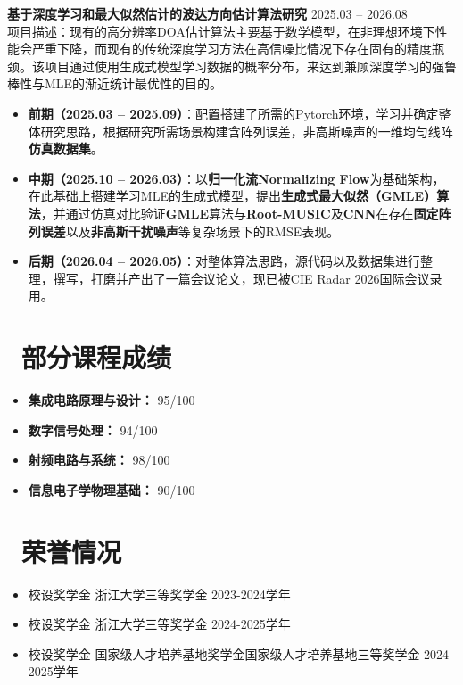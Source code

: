 \documentclass[11pt]{article}
\newlength{\interProjectSpacing}
\newcommand{\projectsep}{\vspace{\interProjectSpacing}}
\newlength{\intraProjectTitleSep}
\newcommand{\titlebreak}{\\[\intraProjectTitleSep]}
\newlength{\intraProjectListTopSep}
\begin{document}
\projectsep

\textbf{基于深度学习和最大似然估计的波达方向估计算法研究} \hfill 2025.03 -- 2026.08 \titlebreak
项目描述：现有的高分辨率DOA估计算法主要基于数学模型，在非理想环境下性能会严重下降，而现有的传统深度学习方法在高信噪比情况下存在固有的精度瓶颈。该项目通过使用生成式模型学习数据的概率分布，来达到兼顾深度学习的强鲁棒性与MLE的渐近统计最优性的目的。
\begin{itemize}[nosep, topsep=\intraProjectListTopSep]
    \item \textbf{前期（2025.03 -- 2025.09）}：配置搭建了所需的Pytorch环境，学习并确定整体研究思路，根据研究所需场景构建含阵列误差，非高斯噪声的一维均匀线阵\textbf{仿真数据集}。
    \item \textbf{中期（2025.10 -- 2026.03）}：以\textbf{归一化流Normalizing Flow}为基础架构，在此基础上搭建学习MLE的生成式模型，提出\textbf{生成式最大似然（GMLE）算法}，并通过仿真对比验证\textbf{GMLE}算法与\textbf{Root-MUSIC}及\textbf{CNN}在存在\textbf{固定阵列误差}以及\textbf{非高斯干扰噪声}等复杂场景下的RMSE表现。
    \item \textbf{后期（2026.04 -- 2026.05）}：对整体算法思路，源代码以及数据集进行整理，撰写，打磨并产出了一篇会议论文，现已被CIE Radar 2026国际会议录用。
\end{itemize}
\vspace{1em}

\section{\makebox[\widthof{\faCogs}][c]{\color{CVBlue}\faCogs}\ 部分课程成绩}
\begin{itemize}[nosep]
    \item \textbf{集成电路原理与设计：} 95/100
    \item \textbf{数字信号处理：} 94/100
    \item \textbf{射频电路与系统：} 98/100
    \item \textbf{信息电子学物理基础：} 90/100
\end{itemize}
\section{\makebox[\widthof{\faGraduationCap}][c]{\color{CVBlue}\faList}\ 荣誉情况}
\begin{itemize}
    \item 校设奖学金 浙江大学三等奖学金 \hfill 2023-2024学年
    \item 校设奖学金 浙江大学三等奖学金 \hfill 2024-2025学年
    \item 校设奖学金 国家级人才培养基地奖学金国家级人才培养基地三等奖学金 \hfill 2024-2025学年
\end{itemize}
\end{document}
